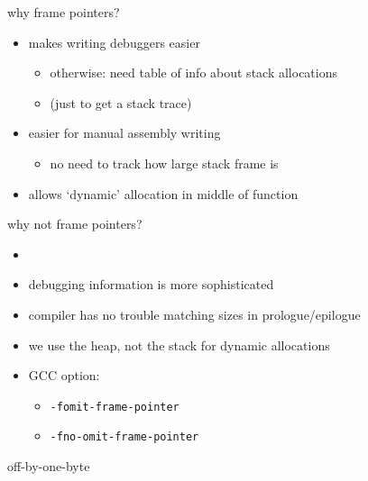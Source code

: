 \begin{frame}{why frame pointers?}
    \begin{itemize}
    \item makes writing debuggers easier
        \begin{itemize}
        \item otherwise: need table of info about stack allocations
        \item (just to get a stack trace)
        \end{itemize}
    \item easier for manual assembly writing 
        \begin{itemize}
        \item no need to track how large stack frame is
        \end{itemize}
    \item allows `dynamic' allocation in middle of function
    \end{itemize}
\end{frame}

\begin{frame}{why not frame pointers?}
    \begin{itemize}
    \item {}
    \item debugging information is more sophisticated
    \item compiler has no trouble matching sizes in prologue/epilogue
    \item we use the heap, not the stack for dynamic allocations
    \vspace{.5cm}
    \item GCC option:
        \begin{itemize}
        \item {\tt -fomit-frame-pointer}
        \item {\tt -fno-omit-frame-pointer}
        \end{itemize}
    \end{itemize}
\end{frame}

\begin{frame}[fragile,label=offByOne]{off-by-one-byte}
\end{frame}

